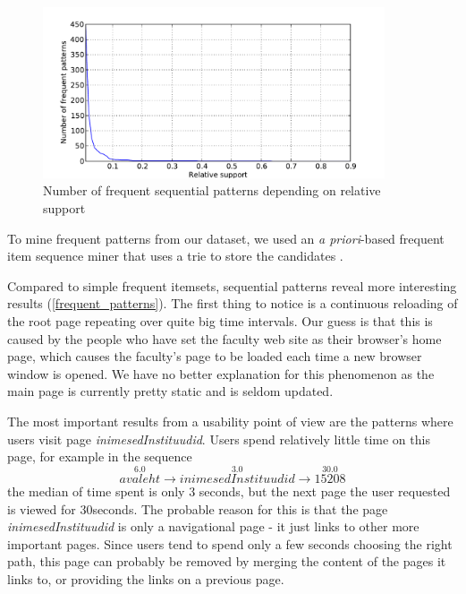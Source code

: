 \documentclass[12pt, english,a4paper]{article}
\begin{document}
\begin{figure}[H]
  \centering
      \includegraphics[width=0.9\textwidth]{sequential_itemset_count}
  \caption{Number of frequent sequential patterns depending on relative support}
\end{figure}


To mine frequent patterns from our dataset, we used an \emph{a priori}-based frequent item sequence miner that uses a trie to store the candidates \cite{seq_apriori}.


Compared to simple frequent itemsets, sequential patterns reveal more interesting results (\ref{frequent_patterns}). The first thing to notice is a continuous reloading of the root page repeating over quite big time intervals. Our guess is that this is caused by the people who have set the faculty web site as their browser's home page, which causes the faculty's page to be loaded each time a new browser window is opened. We have no better explanation for this phenomenon as the main page is currently pretty static and is seldom updated.

The most important results from a usability point of view are the patterns where users visit page \emph{inimesedInstituudid}. Users spend relatively little time on this page, for example in the sequence
\[ 
\overset{6.0}{avaleht} \rightarrow \overset{3.0}{inimesedInstituudid} \rightarrow \overset{30.0}{15208} 
\]
the median of time spent is only 3 seconds, but the next page the user requested is viewed for 30seconds. The probable reason for this is that the page \emph{inimesedInstituudid} is only a navigational page - it just links to other more important pages. Since users tend to spend only a few seconds choosing the right path, this page can probably be removed by merging the content of the pages it links to, or providing the links on a previous page.
\end{document}
